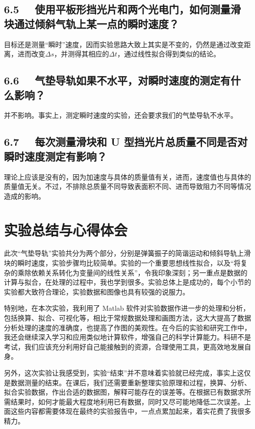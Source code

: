 \documentclass[UTF8]{article}
\theoremstyle{MyLineTheoremStyle} %
\theoremstyle{MyBlockTheoremStyle} %
\theoremstyle{MySubsubsectionStyle} %
\begin{document}
\subsection*{6.5 \ \  使用平板形挡光片和两个光电门，如何测量滑块通过倾斜气轨上某一点的瞬时速度？}

目标还是测量“瞬时”速度，因而实验思路大致上其实是不变的，仍然是通过改变距离，进而改变$\Delta s$，并测得其相应的$\Delta t$，通过线性拟合得到类似的结论。

\subsection*{6.6 \ \ 气垫导轨如果不水平，对瞬时速度的测定有什么影响？}

并不影响。事实上，测定瞬时速度的实验，还会要求我们的气垫导轨不水平。

\subsection*{6.7 \ \ 每次测量滑块和 U 型挡光片总质量不同是否对瞬时速度测定有影响？}
理论上应该是没有的，因为加速度与具体的质量值有关，进而，速度值也与具体的质量值无关。不过，不排除总质量不同导致表面积不同、进而导致阻力不同等情况造成的影响。




\section{实验总结与心得体会}


此次“气垫导轨”实验共分为两个部分，分别是弹簧振子的简谐运动和倾斜导轨上滑块的瞬时速度，实验步骤均比较简单。实验的一个重要思想线性拟合，以及“将复杂的乘除依赖关系转化为变量间的线性关系”，令我印象深刻；另一重点是数据的计算与拟合，在处理的过程中，我也学到很多。实验总体上是成功的，每个小节的实验都大致符合理论，实验数据和图像也具有较强的说服力。

特别地，在本次实验，我利用了 Matlab 软件对实验数据作进一步的处理和分析，包括换算、拟合、可视化等，相比于常规数据处理和画图方法，这大大提高了数据分析处理的速度的准确度，也提高了作图的美观性。在今后的实验和研究工作中，我还会继续深入学习和应用类似地计算软件，增强自己的科学计算能力。科研不是考试，我们应该充分利用好自己能接触到的资源，合理使用工具，更高效地发展自身。

另外，这次实验让我感受到，实验“结束”并不意味着实验就已经完成，事实上这仅是数据测量的结束。在课后，我们还需要重新整理实验原理和过程，换算、分析、拟合实验数据，作出合适的数据图，解释可能存在的误差等。在根据已有数据求所需结果时，如何才能最大程度地利用已有数据，同时又尽可能地降低二次误差。上面这些内容都需要体现在最终的实验报告中，一点点累加起来，着实花费了我很多精力。
\end{document}
